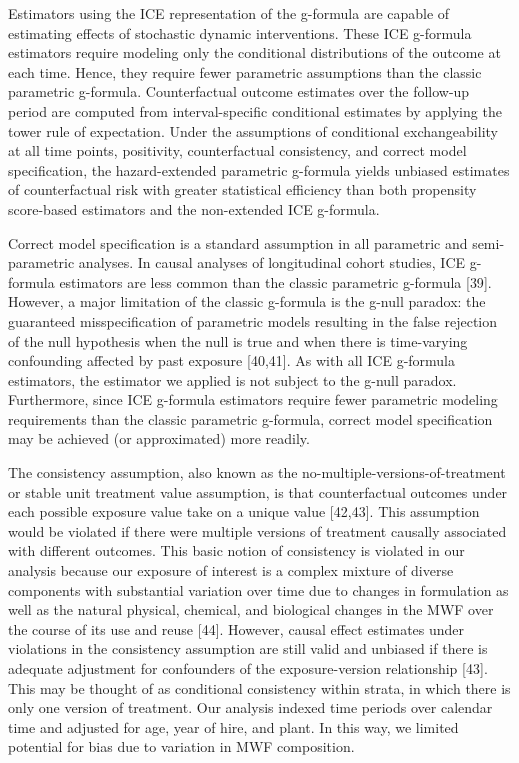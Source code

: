 \documentclass[
  11pt,
  letterpaper,
  DIV=11,
  numbers=noendperiod]{scrartcl}
\begin{document}
Estimators using the ICE representation of the g-formula are capable of
estimating effects of stochastic dynamic interventions. These ICE
g-formula estimators require modeling only the conditional distributions
of the outcome at each time. Hence, they require fewer parametric
assumptions than the classic parametric g-formula. Counterfactual
outcome estimates over the follow-up period are computed from
interval-specific conditional estimates by applying the tower rule of
expectation. Under the assumptions of conditional exchangeability at all
time points, positivity, counterfactual consistency, and correct model
specification, the hazard-extended parametric g-formula yields unbiased
estimates of counterfactual risk with greater statistical efficiency
than both propensity score-based estimators and the non-extended ICE
g-formula.

Correct model specification is a standard assumption in all parametric
and semi-parametric analyses. In causal analyses of longitudinal cohort
studies, ICE g-formula estimators are less common than the classic
parametric g-formula {[}39{]}. However, a major limitation of the
classic g-formula is the g-null paradox: the guaranteed misspecification
of parametric models resulting in the false rejection of the null
hypothesis when the null is true and when there is time-varying
confounding affected by past exposure {[}40,41{]}. As with all ICE
g-formula estimators, the estimator we applied is not subject to the
g-null paradox. Furthermore, since ICE g-formula estimators require
fewer parametric modeling requirements than the classic parametric
g-formula, correct model specification may be achieved (or approximated)
more readily.

The consistency assumption, also known as the
no-multiple-versions-of-treatment or stable unit treatment value
assumption, is that counterfactual outcomes under each possible exposure
value take on a unique value {[}42,43{]}. This assumption would be
violated if there were multiple versions of treatment causally
associated with different outcomes. This basic notion of consistency is
violated in our analysis because our exposure of interest is a complex
mixture of diverse components with substantial variation over time due
to changes in formulation as well as the natural physical, chemical, and
biological changes in the MWF over the course of its use and reuse
{[}44{]}. However, causal effect estimates under violations in the
consistency assumption are still valid and unbiased if there is adequate
adjustment for confounders of the exposure-version relationship
{[}43{]}. This may be thought of as conditional consistency within
strata, in which there is only one version of treatment. Our analysis
indexed time periods over calendar time and adjusted for age, year of
hire, and plant. In this way, we limited potential for bias due to
variation in MWF composition.
\end{document}
